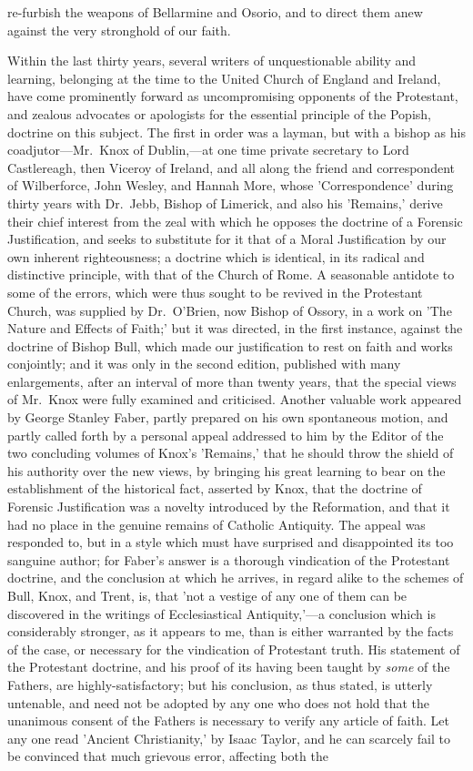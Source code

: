 \documentclass[
]{book}
\begin{document}
re-furbish the weapons of Bellarmine and Osorio, and to direct them anew against the very stronghold of our faith.

Within the last thirty years, several writers of unquestionable ability and learning, belonging at the time to the United Church of England and Ireland, have come prominently forward as uncompromising opponents of the Protestant, and zealous advocates or apologists for the essential principle of the Popish, doctrine on this subject. The first in order was a layman, but with a bishop as his coadjutor---Mr.~Knox of Dublin,---at one time private secretary to Lord Castlereagh, then Viceroy of Ireland, and all along the friend and correspondent of Wilberforce, John Wesley, and Hannah More, whose 'Correspondence' during thirty years with Dr.~Jebb, Bishop of Limerick, and also his 'Remains,' derive their chief interest from the zeal with which he opposes the doctrine of a Forensic Justification, and seeks to substitute for it that of a Moral Justification by our own inherent righteousness; a doctrine which is identical, in its radical and distinctive principle, with that of the Church of Rome. A seasonable antidote to some of the errors, which were thus sought to be revived in the Protestant Church, was supplied by Dr.~O'Brien, now Bishop of Ossory, in a work on 'The Nature and Effects of Faith;' but it was directed, in the first instance, against the doctrine of Bishop Bull, which made our justification to rest on faith and works conjointly; and it was only in the second edition, published with many enlargements, after an interval of more than twenty years, that the special views of Mr.~Knox were fully examined and criticised. Another valuable work appeared by George Stanley Faber, partly prepared on his own spontaneous motion, and partly called forth by a personal appeal addressed to him by the Editor of the two concluding volumes of Knox's 'Remains,' that he should throw the shield of his authority over the new views, by bringing his great learning to bear on the establishment of the historical fact, asserted by Knox, that the doctrine of Forensic Justification was a novelty introduced by the Reformation, and that it had no place in the genuine remains of Catholic Antiquity. The appeal was responded to, but in a style which must have surprised and disappointed its too sanguine author; for Faber's answer is a thorough vindication of the Protestant doctrine, and the conclusion at which he arrives, in regard alike to the schemes of Bull, Knox, and Trent, is, that 'not a vestige of any one of them can be discovered in the writings of Ecclesiastical Antiquity,'---a conclusion which is considerably stronger, as it appears to me, than is either warranted by the facts of the case, or necessary for the vindication of Protestant truth. His statement of the Protestant doctrine, and his proof of its having been taught by \emph{some} of the Fathers, are highly-satisfactory; but his conclusion, as thus stated, is utterly untenable, and need not be adopted by any one who does not hold that the unanimous consent of the Fathers is necessary to verify any article of faith. Let any one read 'Ancient Christianity,' by Isaac Taylor, and he can scarcely fail to be convinced that much grievous error, affecting both the 
\end{document}
